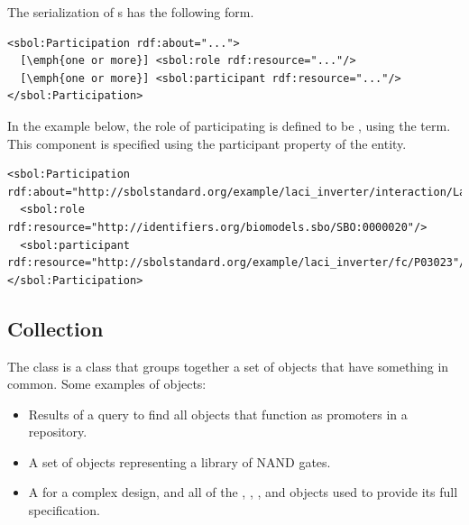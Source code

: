 The serialization of s has the following form.
\begin{lstlisting}
<sbol:Participation rdf:about="...">
  [\emph{one or more}] <sbol:role rdf:resource="..."/>
  [\emph{one or more}] <sbol:participant rdf:resource="..."/>
</sbol:Participation>
\end{lstlisting}

In the example below, the role of participating  is defined to be , using the  term. This component is specified using the participant property of the  entity.
\begin{lstlisting}
<sbol:Participation rdf:about="http://sbolstandard.org/example/laci_inverter/interaction/LacI_pLacI/participation/P03023">
  <sbol:role rdf:resource="http://identifiers.org/biomodels.sbo/SBO:0000020"/>
  <sbol:participant rdf:resource="http://sbolstandard.org/example/laci_inverter/fc/P03023"/>
</sbol:Participation>
\end{lstlisting}

\subsection {Collection}
\label{sec:Collection}
The  class is a class that groups together a set of  objects that have something in common. 
Some examples of  objects:
\begin{itemize}
\item Results of a query to find all  objects that function as promoters in a repository.
\item A set of  objects representing a library of NAND gates.
\item A  for a complex design, and all of the , , , and  objects used to provide its full specification.
\end{itemize}

